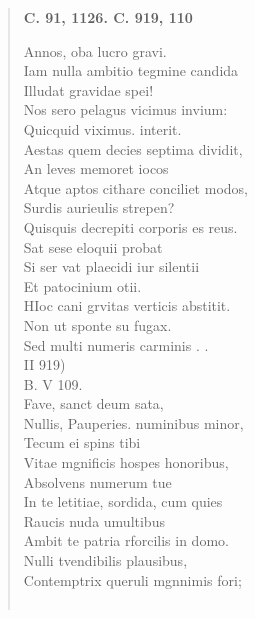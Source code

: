 \documentclass[11pt, a4paper]{report}
\begin{document}
\begin{verse}
     \marginpar{[345]} \begin{center} \textbf{C. 91, 1126. C. 919, 110} \end{center}Annos, oba lucro gravi. \\  \lbrack Iam nulla \rbrack  ambitio tegmine candida \\ Illudat gravidae spei! \\ Nos sero pelagus vicimus invium: \\ Quicquid viximus. interit. \\ Aestas quem decies septima dividit, \\ An leves memoret iocos \\ Atque aptos cithare conciliet modos, \\ Surdis aurieulis strepen? \\ Quisquis decrepiti corporis es reus. \\ Sat sese eloquii probat \\ Si ser \lbrack vat \rbrack  plaecidi iur silentii \\ Et patocinium otii. \\ HIoc cani grvitas verticis abstitit. \\ Non ut sponte su fugax. \\ Sed multi numeris carminis . . \\ II 919) \\ B. V 109. \\ Fave, sanct deum sata, \\ Nullis, Pauperies. numinibus minor, \\ Tecum ei spins tibi \\ Vitae mgnificis hospes honoribus, \\ Absolvens numerum tue \\ In te letitiae, sordida, cum quies \\ Raucis nuda umultibus \\ Ambit te patria rforcilis in domo. \\ Nulli tvendibilis plausibus, \\ Contemptrix queruli mgnnimis fori; \\ 
        ﻿\pagebreak 

\end{verse}
\end{document}
